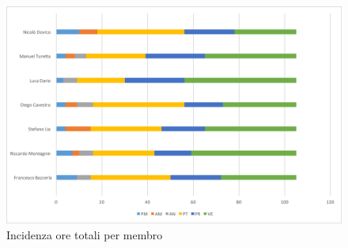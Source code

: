 \begin{figure}[H]
	\centering 
	\includegraphics[scale=0.7]{Immagini/GraficiPianoLavoro/TOT.png}
	\caption{Incidenza ore totali per membro}
\end{figure}